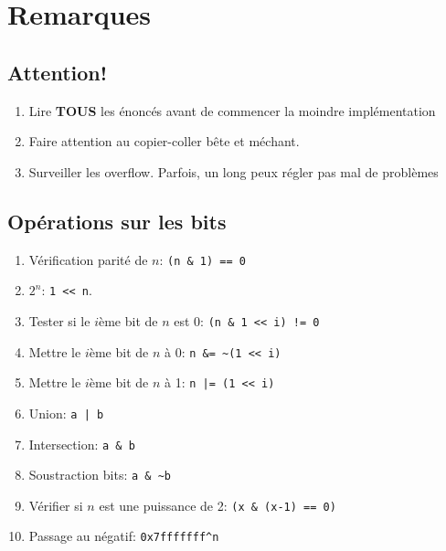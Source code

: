 \section{Remarques}
\subsection{Attention!}
\begin{enumerate}
	\item Lire \textbf{TOUS} les énoncés avant de commencer la moindre implémentation
	\item Faire attention au copier-coller bête et méchant.
	\item Surveiller les overflow. Parfois, un long peux régler pas mal de problèmes
\end{enumerate}
 
\subsection{Opérations sur les bits}
\begin{enumerate}
	\item Vérification parité de $n$: \lstinline{(n & 1) == 0}
	\item $2^n$: \lstinline|1 << n|.
	\item Tester si le $i$ème bit de $n$ est $0$: \lstinline{(n & 1 << i) != 0}
	\item Mettre le $i$ème bit de $n$ à 0: \lstinline{n &= ~(1 << i)}
	\item Mettre le $i$ème bit de $n$ à 1: \lstinline{n |= (1 << i)}
	\item Union: \lstinline{a | b}
	\item Intersection: \lstinline{a & b}
	\item Soustraction bits: \lstinline{a & ~b}
	\item Vérifier si $n$ est une puissance de 2: \lstinline{(x & (x-1) == 0)}
	\item Passage au négatif: \lstinline{0x7fffffff^n}
\end{enumerate}